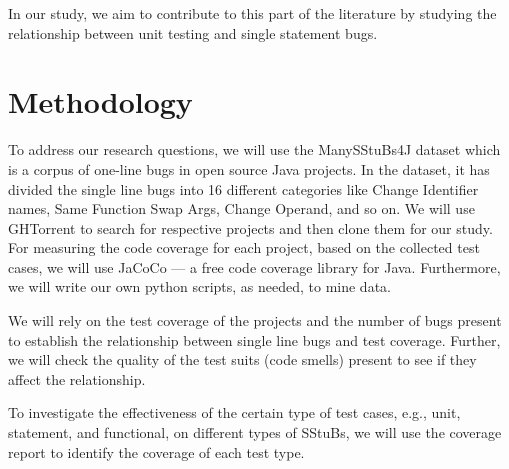 \documentclass[11pt]{article}
\begin{document}
In our study, we aim to contribute to this part of the literature by studying the relationship between unit testing and single statement bugs.



\section{Methodology}

To address our research questions, we will use the ManySStuBs4J\cite{karampatsis2020often} dataset which is a corpus of one-line bugs in open source Java projects. In the dataset, it has divided the single line bugs into 16 different categories like Change Identifier names, Same Function Swap Args, Change Operand, and so on. We will use GHTorrent \cite{Gousi13} to search for respective projects and then clone them for our study. For measuring the code coverage for each project, based on the collected test cases, we will use JaCoCo — a free code coverage library for Java. Furthermore, we will write our own python scripts, as needed, to mine data.

We will rely on the test coverage of the projects and the number of bugs present to establish the relationship between single line bugs and test coverage. Further, we will check the quality of the test suits (code smells) present to see if they affect the relationship.

To investigate the effectiveness of the certain type of test cases, e.g., unit, statement, and functional, on different types of SStuBs, we will use the coverage report to identify the coverage of each test type.




\end{document}
